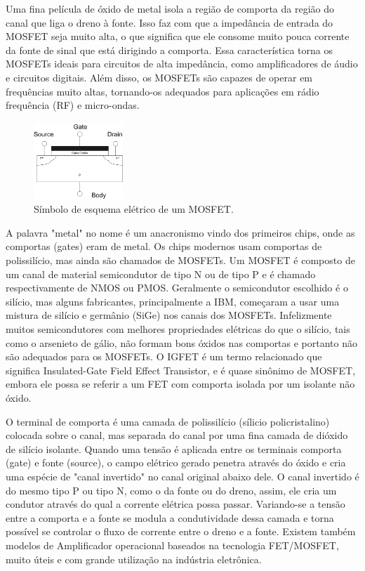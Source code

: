 \documentclass[12pt]{article}
\begin{document}
        Uma fina película de óxido de metal isola a região de comporta da região do canal que liga o dreno à fonte. Isso faz com que a impedância de entrada do MOSFET seja muito alta, o que significa que ele consome muito pouca corrente da fonte de sinal que está dirigindo a comporta. Essa característica torna os MOSFETs ideais para circuitos de alta impedância, como amplificadores de áudio e circuitos digitais. Além disso, os MOSFETs são capazes de operar em frequências muito altas, tornando-os adequados para aplicações em rádio frequência (RF) e micro-ondas.

        \begin{figure}[htpb!]

            \centering
            \includegraphics[width=0.3\textwidth]{./images/FET_cross_section.png}
            \caption{Símbolo de esquema elétrico de um MOSFET.}

        \end{figure}



        A palavra "metal" no nome é um anacronismo vindo dos primeiros chips, onde as comportas (gates) eram de metal. Os chips modernos usam comportas de polissilício, mas ainda são chamados de MOSFETs. Um MOSFET é composto de um canal de material semicondutor de tipo N ou de tipo P e é chamado respectivamente de NMOS ou PMOS. Geralmente o semicondutor escolhido é o silício, mas alguns fabricantes, principalmente a IBM, começaram a usar uma mistura de silício e germânio (SiGe) nos canais dos MOSFETs. Infelizmente muitos semicondutores com melhores propriedades elétricas do que o silício, tais como o arsenieto de gálio, não formam bons óxidos nas comportas e portanto não são adequados para os MOSFETs. O IGFET é um termo relacionado que significa Insulated-Gate Field Effect Transistor, e é quase sinônimo de MOSFET, embora ele possa se referir a um FET com comporta isolada por um isolante não óxido.

        O terminal de comporta é uma camada de polissilício (sílicio policristalino) colocada sobre o canal, mas separada do canal por uma fina camada de dióxido de silício isolante. Quando uma tensão é aplicada entre os terminais comporta (gate) e fonte (source), o campo elétrico gerado penetra através do óxido e cria uma espécie de "canal invertido" no canal original abaixo dele. O canal invertido é do mesmo tipo P ou tipo N, como o da fonte ou do dreno, assim, ele cria um condutor através do qual a corrente elétrica possa passar. Variando-se a tensão entre a comporta e a fonte se modula a condutividade dessa camada e torna possível se controlar o fluxo de corrente entre o dreno e a fonte. Existem também modelos de Amplificador operacional baseados na tecnologia FET/MOSFET, muito úteis e com grande utilização na indústria eletrônica.
\end{document}
